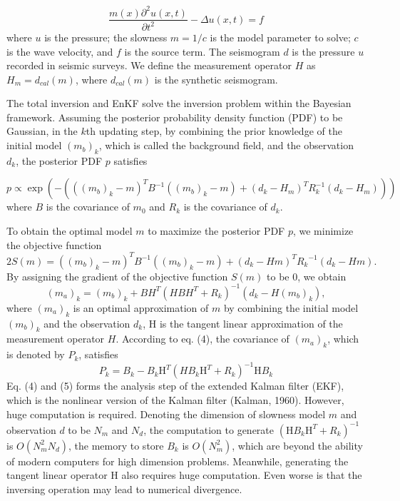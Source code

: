 \documentclass[mreferee]{gji}
\begin{document}
\begin{equation}
\frac{m(x)\partial ^2{u}(x,t)}{\partial{t^2}}-\Delta u(x,t)=f
\end{equation}
where $u$ is the pressure; the slowness $m=1/c$ is the model parameter to solve; $c$ is the wave velocity, and $f$ is the source term. The seismogram $d$ is the pressure $u$ recorded in seismic surveys. We define the measurement operator $H$ as $H_m=d_{cal}(m)$, where $d_{cal}(m)$ is the synthetic seismogram.

The total inversion and EnKF solve the inversion problem within the Bayesian framework. Assuming the posterior probability density function (PDF) to be Gaussian, in the $k$th updating step, by combining the prior knowledge of the initial model $(m_b)_k$, which is called the background field, and the observation $d_k$, the posterior PDF $p$ satisfies


\begin{equation}
p \varpropto \exp\left ( -\left ( \left ( \left ( m_b \right )_k - m \right )^T B^{-1} \left ( \left ( m_b \right )_k -m\right ) +\left ( d_k-H_m \right )^TR_k^{-1}\left ( d_k-H_m \right )\right ) \right )
\end{equation}
where $B$ is the covariance of $m_0$ and $R_k$ is the covariance of $d_k$. 

To obtain the optimal model $m$ to maximize the posterior PDF $p$, we minimize the objective function
\begin{equation}
2S(m)=((m_b)_k-m)^TB^{-1}((m_b)_k-m)+(d_k-Hm)^T{R_k}^{-1}(d_k-Hm).
\end{equation}
By assigning the gradient of the objective function $S(m)$ to be 0, we obtain
\begin{equation}
(m_a)_k=(m_b)_k+BH^T(HBH^T+R_k)^{-1}(d_k-H(m_b)_k),
\end{equation}
where $(m_a)_k$ is an optimal approximation of $m$ by combining the initial model $(m_b)_k$ and the observation $d_k$, H is the tangent linear approximation of the measurement operator $H$. 
According to eq. (4), the covariance of $(m_a)_k$, which is denoted by $P_k$, satisfies
\begin{equation}
P_k=B_k-B_k\mbox{H}^T(HB_k\mbox{H}^T+R_k)^{-1}\mbox{H}B_k
\end{equation}
Eq. (4) and (5) forms the analysis step of the extended Kalman filter (EKF), which is the nonlinear version of the Kalman filter (Kalman, 1960). However, huge computation is required. Denoting the dimension of slowness model $m$ and observation $d$ to be $N_m$ and $N_d$, the computation to generate $(\mbox{H}B_k\mbox{H}^T+R_k)^{-1}$ is $O(N_m^2N_d)$, the memory to store $B_k$ is $O(N_m^2)$, which are beyond the ability of modern computers for high dimension problems. Meanwhile, generating the tangent linear operator H also requires huge computation. Even worse is that the inversing operation may lead to numerical divergence.
\end{document}

